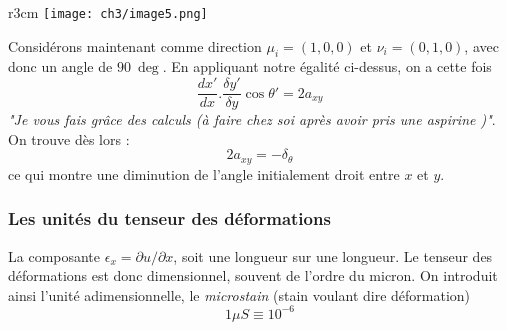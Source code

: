         \begin{wrapfigure}[9]{r}{3cm}
        \texttt{[image: ch3/image5.png]}
        \end{wrapfigure}
        Considérons maintenant comme direction $\mu_i = (1,0,0)$ et $\nu_i=(0,1,0)$, avec donc 
        un angle de $90\ \deg$. En appliquant notre égalité ci-dessus, on a cette fois 
        \begin{equation}
        \dfrac{dx'}{dx}.\dfrac{\delta y'}{\delta y}\cos\theta' = 2a_{xy}
        \end{equation}
        \textit{"Je vous fais grâce des calculs (à faire chez soi après avoir pris une aspirine
        )"}. On trouve dès lors :
        \begin{equation}
        2a_{xy} = -\delta_\theta
        \end{equation}
        ce qui montre une diminution de l'angle initialement droit entre $x$ et $y$. 
        
        
        \subsubsection{Les unités du tenseur des déformations}
        La composante $\epsilon_x = \partial u/\partial x$, soit une longueur sur une longueur.
        Le tenseur des déformations est donc dimensionnel, souvent de l'ordre du micron. On 
        introduit ainsi l'unité adimensionnelle, le \textit{microstain} (stain voulant dire
        déformation)
        \begin{equation}
        1\mu S \equiv 10^{-6}
        \end{equation}
